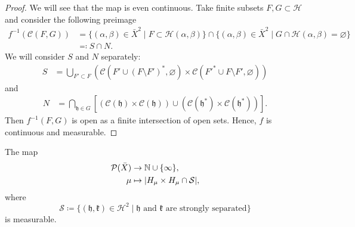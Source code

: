 \begin{proof}
  We will see that the map is even continuous. Take finite subsets \(F,G \subset \mathcal{H}\) and consider the following preimage
  \begin{align*}
    f^{-1}(\mathcal{C}(F, G))  & = \{(\alpha, \beta) \in \bar X^2 \mid F \subset \mathcal{H}(\alpha, \beta) \} \cap \{(\alpha, \beta) \in \bar X^2  \mid G \cap \mathcal{H}(\alpha, \beta) = \varnothing\}\\
                                 &\eqqcolon S \cap N.
  \end{align*}
  We will consider \(S\) and \(N\) separately:
  \begin{align*}
    S & = \bigcup_{F' \subset F} \left( \mathcal{C}(F' \cup (F \setminus F')^\ast, \varnothing) \times \mathcal{C}(F'^\ast  \cup F \setminus F', \varnothing) \right)
  \end{align*}
  and
  \begin{align*}
    N & = \bigcap_{\mathfrak{h} \in G}\left[(\mathcal{C}(\mathfrak{h}) \times \mathcal{C}(\mathfrak{h})) \cup (\mathcal{C}(\mathfrak{h}^\ast) \times \mathcal{C}(\mathfrak{h}^\ast))\right].
  \end{align*}
  Then \(f^{-1}(F,G)\) is open as a finite intersection of open sets. Hence, \(f\) is continuous and measurable.
\end{proof}

\begin{lemma}
  \label{lem:measurable-str-sep}
  The map
  \begin{align*}
    \mathcal{P}(\bar X) & \to \mathbb{N} \cup \{\infty\},\\
    \mu & \mapsto |H_\mu\times H_\mu \cap \mathcal{S}|,
  \end{align*}
  where
  \[
    \mathcal{S}\coloneqq \{(\mathfrak{h},\mathfrak{k}) \in \mathcal{H}^2 \mid \mathfrak{h} \text{ and } \mathfrak{k} \text{ are strongly separated}\}
  \]
  is measurable.
\end{lemma}


